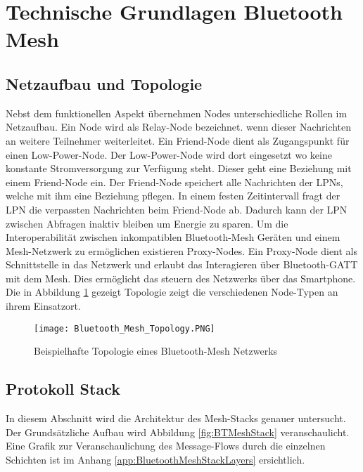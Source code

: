 \clearpage
\section{Technische Grundlagen Bluetooth Mesh}\label{sec:TechnischeGrundlagenBluetoothMesh}




\subsection{Netzaufbau und Topologie}\label{sec:NetzaufbauundTopologie}

Nebst dem funktionellen Aspekt übernehmen Nodes unterschiedliche Rollen im Netzaufbau. Ein Node wird als Relay-Node bezeichnet. wenn dieser Nachrichten an weitere Teilnehmer weiterleitet. Ein Friend-Node dient als Zugangspunkt für einen Low-Power-Node. Der Low-Power-Node wird dort eingesetzt wo keine konstante Stromversorgung zur Verfügung steht. Dieser geht eine Beziehung mit einem Friend-Node ein. Der Friend-Node speichert alle Nachrichten der LPNs, welche mit ihm eine Beziehung pflegen. In einem festen Zeitintervall fragt der LPN die verpassten Nachrichten beim Friend-Node ab. Dadurch kann der LPN zwischen Abfragen inaktiv bleiben um Energie zu sparen. Um die Interoperabilität zwischen inkompatiblen Bluetooth-Mesh Geräten und einem Mesh-Netzwerk zu ermöglichen existieren Proxy-Nodes. Ein Proxy-Node dient als Schnittstelle in das Netzwerk und erlaubt das Interagieren über Bluetooth-GATT mit dem Mesh. Dies ermöglicht das steuern des Netzwerks über das Smartphone. Die in Abbildung \ref{fig:BTMeshTopology} gezeigt Topologie zeigt die verschiedenen Node-Typen an ihrem Einsatzort. 

\begin{figure} [H]
	\centering
	\texttt{[image: Bluetooth\_Mesh\_Topology.PNG]}
	\caption{Beispielhafte Topologie eines Bluetooth-Mesh Netzwerks \cite{bluetooth_sig_mesh_netzwerk_spezifikationen_2020}} 
	\label{fig:BTMeshTopology}
\end{figure}


\subsection{Protokoll Stack}\label{sec:BLEMeshProtokollStack}

In diesem Abschnitt wird die Architektur des Mesh-Stacks genauer untersucht. Der Grundsätzliche Aufbau wird Abbildung \ref{fig:BTMeshStack} veranschaulicht. Eine Grafik zur Veranschaulichung des Message-Flows durch die einzelnen Schichten ist im Anhang \ref{app:BluetoothMeshStackLayers} ersichtlich. 

